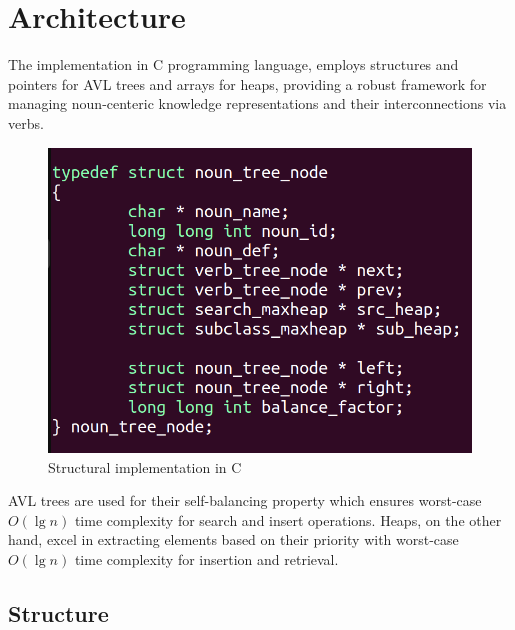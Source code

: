 \documentclass[conference]{IEEEtran}
\begin{document}
\section{Architecture}

The implementation in C programming language\cite{b9}, employs structures and pointers for AVL trees and arrays for heaps, providing a robust framework for managing noun-centeric knowledge representations and their interconnections via verbs.

\begin{figure}[htbp]
\centering
\includegraphics[width=0.8\linewidth]{c1.png} %
\caption{Structural implementation in C}
\label{fig}
\end{figure}

AVL trees are used for their self-balancing property which ensures worst-case $O(\lg n)$ time complexity for search and insert operations.
Heaps, on the other hand, excel in extracting elements based on their priority with worst-case $O(\lg n)$ time complexity for insertion and retrieval. 


\subsection{Structure}
\end{document}
